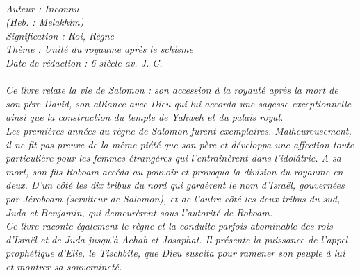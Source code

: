 \BFont
\noindent\hrulefill
{\footnotesize
\textit{
\bigskip
{\centering{}
\\Auteur : Inconnu
\\(Heb. : Melakhim)
\\Signification : Roi, Règne
\\Thème : Unité du royaume après le schisme
\\Date de rédaction : 6 siècle av. J.-C.\\}
}
\textit{
\\Ce livre relate la vie de Salomon : son accession à la royauté après la mort de son père David, son alliance avec Dieu qui lui accorda une sagesse exceptionnelle ainsi que la construction du temple de Yahweh et du palais royal.
\\Les premières années du règne de Salomon furent exemplaires. Malheureusement, il ne fit pas preuve de la même piété que son père et développa une affection toute particulière pour les femmes étrangères qui l'entrainèrent dans l'idolâtrie. A sa mort, son fils Roboam accéda au pouvoir et provoqua la division du royaume en deux. D'un côté les dix tribus du nord qui gardèrent le nom d'Israël, gouvernées par Jéroboam (serviteur de Salomon), et de l'autre côté les deux tribus du sud, Juda et Benjamin, qui demeurèrent sous l'autorité de Roboam.
\\Ce livre raconte également le règne et la conduite parfois abominable des rois d'Israël et de Juda jusqu'à Achab et Josaphat.
Il présente la puissance de l'appel prophétique d'Elie, le Tischbite, que Dieu suscita pour ramener son peuple à lui et
montrer sa souveraineté.\bigskip
}
}
\par\nobreak\noindent\hrulefill
